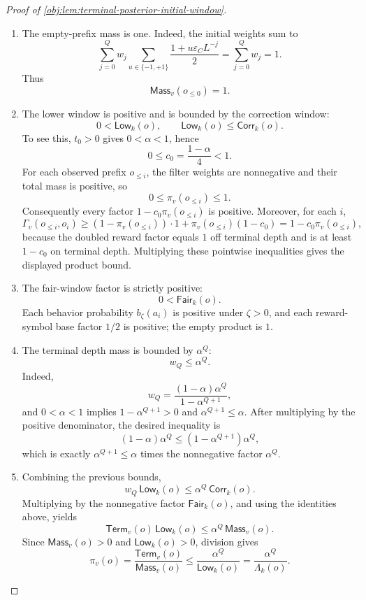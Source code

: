 \documentclass[11pt]{article}
\begin{document}
\begin{proof}[Proof of \cref{obj:lem:terminal-posterior-initial-window}]
\begin{enumerate}
\item The empty-prefix mass is one.  Indeed, the initial weights sum to
\[
\sum_{j=0}^Q
w_j
\sum_{u\in\{-1,+1\}}
\frac{1+u\varepsilon_C L^{-j}}2
=
\sum_{j=0}^Q w_j
=
1.
\]
Thus
\[
\mathsf{Mass}_v(o_{\le0})=1.
\]

\item The lower window is positive and is bounded by the correction window:
\[
0<\mathsf{Low}_k(o),
\qquad
\mathsf{Low}_k(o)\le \mathsf{Corr}_k(o).
\]
To see this, \(t_0>0\) gives \(0<\alpha<1\), hence
\[
0\le c_0=\frac{1-\alpha}{4}<1.
\]
For each observed prefix \(o_{\le i}\), the filter weights are nonnegative and their total mass is positive, so
\[
0\le \pi_v(o_{\le i})\le 1.
\]
Consequently every factor \(1-c_0\pi_v(o_{\le i})\) is positive.  Moreover, for each \(i\),
\[
\Gamma_v(o_{\le i},o_i)
\ge
(1-\pi_v(o_{\le i}))\cdot 1
+
\pi_v(o_{\le i})(1-c_0)
=
1-c_0\pi_v(o_{\le i}),
\]
because the doubled reward factor equals \(1\) off terminal depth and is at least \(1-c_0\) on terminal depth.  Multiplying these pointwise inequalities gives the displayed product bound.

\item The fair-window factor is strictly positive:
\[
0<\mathsf{Fair}_k(o).
\]
Each behavior probability \(b_\zeta(a_i)\) is positive under \(\zeta>0\), and each reward-symbol base factor \(1/2\) is positive; the empty product is \(1\).

\item The terminal depth mass is bounded by \(\alpha^Q\):
\[
w_Q\le \alpha^Q.
\]
Indeed,
\[
w_Q=\frac{(1-\alpha)\alpha^Q}{1-\alpha^{Q+1}},
\]
and \(0<\alpha<1\) implies \(1-\alpha^{Q+1}>0\) and \(\alpha^{Q+1}\le \alpha\).  After multiplying by the positive denominator, the desired inequality is
\[
(1-\alpha)\alpha^Q
\le
(1-\alpha^{Q+1})\alpha^Q,
\]
which is exactly \(\alpha^{Q+1}\le\alpha\) times the nonnegative factor \(\alpha^Q\).

\item Combining the previous bounds,
\[
w_Q\,\mathsf{Low}_k(o)
\le
\alpha^Q\,\mathsf{Corr}_k(o).
\]
Multiplying by the nonnegative factor \(\mathsf{Fair}_k(o)\), and using the identities above, yields
\[
\mathsf{Term}_v(o)\,\mathsf{Low}_k(o)
\le
\alpha^Q\,\mathsf{Mass}_v(o).
\]
Since \(\mathsf{Mass}_v(o)>0\) and \(\mathsf{Low}_k(o)>0\), division gives
\[
\pi_v(o)
=
\frac{\mathsf{Term}_v(o)}{\mathsf{Mass}_v(o)}
\le
\frac{\alpha^Q}{\mathsf{Low}_k(o)}
=
\frac{\alpha^Q}{\Lambda_k(o)}.
\]
\end{enumerate}
\end{proof}
\end{document}
